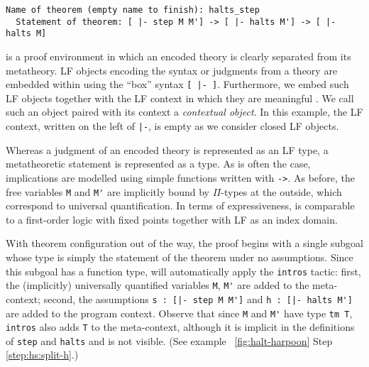 \begin{lstlisting}[language=Beluga, deletekeywords={of}]
  Name of theorem (empty name to finish): halts_step
  Statement of theorem: [ |- step M M'] -> [ |- halts M'] -> [ |- halts M]
\end{lstlisting}

\Beluga{} is a proof environment in which an encoded theory is clearly separated
from its metatheory.
LF objects encoding the syntax or judgments from a theory are embedded within
\Beluga{} using the ``box'' syntax \lstinline![ |- ]!.
Furthermore, we embed such LF objects together with the LF context in which they
are meaningful \cite{Pientka:POPL08,Pientka:PPDP08,Nanevski:ICML05}.
We call such an object paired with its context a \emph{contextual object}.
In this example, the LF context, written on the left of \lstinline!|-!, is
empty as we consider closed LF objects.

Whereas a judgment of an encoded
theory is represented as an LF type, a metatheoretic statement is represented as
a \Beluga{} type. As is often the case, implications are modelled using simple
functions written with \lstinline!->!.
As before, the free variables \lstinline!M! and \lstinline!M'! are implicitly
bound by $\Pi$-types at the outside, which correspond to universal
quantification.
In terms of expressiveness, \Beluga{} is comparable to a first-order logic with
fixed points together with LF as an index domain.

With theorem configuration out of the way, the proof begins with a single
subgoal whose type is simply the statement of the theorem under no
assumptions.
Since this subgoal has a function type, \Harpoon{} will automatically apply the
\lstinline!intros! tactic:
first, the (implicitly) universally quantified variables
\lstinline!M!, \lstinline!M'! are added to the meta-context;
second, the assumptions \lstinline!s : [|- step M M']! and
\lstinline!h : [|- halts M']! are added to the program context.
Observe that since \lstinline!M! and \lstinline!M'! have type \lstinline!tm T!,
\lstinline!intros! also adds \lstinline!T! to the meta-context, although it is
implicit in the definitions of \lstinline!step! and \lstinline!halts! and is not
visible.
(See \Harpoon{} example ~\ref{fig:halt-harpoon} Step \ref{step:hs:split-h}.)

\begin{HarpoonProof}[ht] %
  
\end{HarpoonProof}

